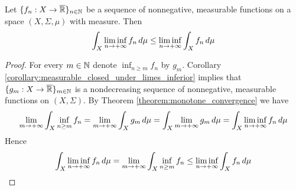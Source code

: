 \begin{theorem}\label{theorem:fatous_lemma}
    Let $\{f_n:X\rightarrow \overline{{\mathbb R}}\}_{n\in {\mathbb N}}$ be a sequence of nonnegative, measurable functions on a space $(X,\Sigma,\mu)$ with measure. Then
    $$\int_X\liminf_{n\rightarrow +\infty}f_n\,d\mu \leq \liminf_{n\rightarrow +\infty}\int_Xf_n\,d\mu$$
\end{theorem}
\begin{proof}
    For every $m\in {\mathbb N}$ denote $\inf_{n\geq m}f_n$ by $g_m$. Corollary \ref{corollary:measurable_closed_under_limes_inferior} implies that $\{g_m:X\rightarrow \overline{{\mathbb R}}\}_{m\in {\mathbb N}}$ is a nondecreasing sequence of nonnegative, measurable functions on $(X,\Sigma)$. By Theorem \ref{theorem:monotone_convergence} we have
    $$\lim_{m\rightarrow +\infty}\int_X\inf_{n\geq m}f_n = \lim_{m\rightarrow +\infty}\int_Xg_m\,d\mu = \int_X\lim_{m\rightarrow +\infty}g_m\,d\mu = \int_X\liminf_{n\rightarrow +\infty}f_n\,d\mu$$
    Hence
    $$\int_X\liminf_{n\rightarrow +\infty}f_n\,d\mu = \lim_{m\rightarrow +\infty}\int_X\inf_{n\geq m}f_n \leq \liminf_{n\rightarrow +\infty}\int_Xf_n\,d\mu$$
\end{proof}

